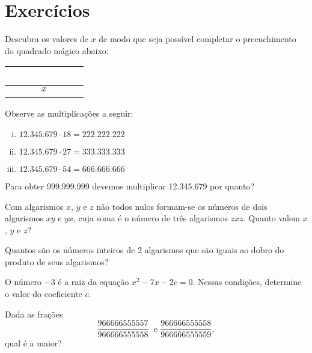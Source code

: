 \section{Exercícios}

\begin{exercise}
Descubra os valores de $x$ de modo que seja possível completar
o preenchimento do quadrado mágico abaixo:
\begin{center}
\begin{tabular}{|c|c|c|}
  \hline
   \ \ \  & \ \ \  & \ \ \  \\ \hline
          & $x$    &        \\ \hline
          &        &        \\
  \hline
\end{tabular}
\end{center}
\end{exercise}

\begin{exercise}
Observe as multiplicações a seguir:
\begin{enumerate}[i.]
  \item $12.345.679 \cdot 18 = 222.222.222$
  \item $12.345.679 \cdot 27 = 333.333.333$
  \item $12.345.679 \cdot 54 = 666.666.666$
\end{enumerate}
Para obter 999.999.999 devemos multiplicar 12.345.679 por quanto?
\end{exercise}

\begin{exercise}
Com algarismos $x$, $y$ e $z$ não todos nulos formam-se os
números de dois algarismos $xy$ e $yx$, cuja soma é o número de três
algarismos $zxz$. Quanto valem $x$, $y$ e $z$?
\end{exercise}

\begin{exercise}
Quantos são os números inteiros de 2 algarismos que são iguais
ao dobro do produto de seus algarismos?
\end{exercise}


\begin{exercise}
O número $-3$ é a raiz da equação $x^2 -7x -2c = 0$. Nessas
condições, determine o valor do coeficiente $c$.
\end{exercise}

\begin{exercise}
Dada as frações $$\frac{966666555557}{966666555558} \; \text{ e
} \; \frac{966666555558}{966666555559},$$ qual é a maior?
\end{exercise}


